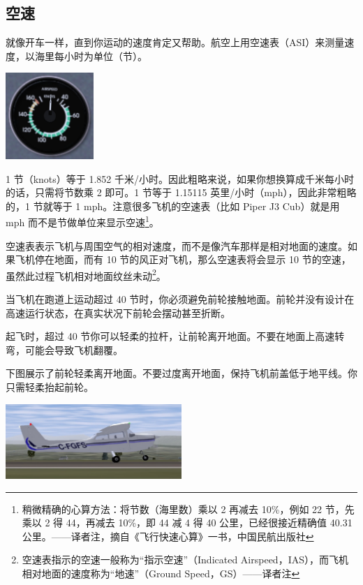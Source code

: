 \subsection{空速}

就像开车一样，直到你运动的速度肯定又帮助。航空上用空速表（ASI）来测量速度，以海里每小时为单位（节）。

\begin{center}
\includegraphics[width=0.25\textwidth]{img/tut_24}
\end{center}

1 节（knots）等于 1.852 千米/小时。因此粗略来说，如果你想换算成千米每小时的话，只需将节数乘 2 即可。1 节等于 1.15115 英里/小时（mph），因此非常粗略的，1 节就等于 1 mph。注意很多飞机的空速表（比如 Piper J3 Cub）就是用 mph 而不是节做单位来显示空速\footnote{稍微精确的心算方法：将节数（海里数）乘以 2 再减去 10\%，例如 22 节，先乘以 2 得 44，再减去 10\%，即 44 减 4 得 40 公里，已经很接近精确值 40.31 公里。——译者注，摘自《飞行快速心算》一书，中国民航出版社}。

空速表表示飞机与周围空气的相对速度，而不是像汽车那样是相对地面的速度。如果飞机停在地面，而有 10 节的风正对飞机，那么空速表将会显示 10 节的空速，虽然此过程飞机相对地面纹丝未动\footnote{空速表指示的空速一般称为“指示空速”（Indicated Airspeed，IAS），而飞机相对地面的速度称为“地速”（Ground Speed，GS）——译者注}。

当飞机在跑道上运动超过 40 节时，你必须避免前轮接触地面。前轮并没有设计在高速运行状态，在真实状况下前轮会摆动甚至折断。

起飞时，超过 40 节你可以轻柔的拉杆，让前轮离开地面。不要在地面上高速转弯，可能会导致飞机翻覆。

下图展示了前轮轻柔离开地面。不要过度离开地面，保持飞机前盖低于地平线。你只需轻柔抬起前轮。

\begin{center}
\includegraphics[width=0.5\textwidth]{img/tut_25}
\end{center}

